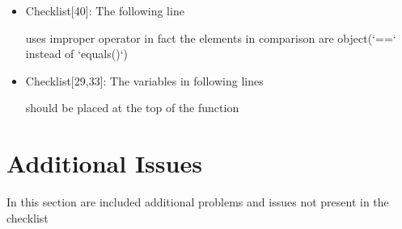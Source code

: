 \documentclass[11pt,titlepage]{article} %
\begin{document}
\begin{itemize}
\begin{itemize}
    \item Checklist[40]: The following line
      
      uses improper operator in fact the elements in comparison are object(`==` instead of `equals()`)
    \item Checklist[29,33]: The variables in following lines
      
      should be placed at the top of the function
    \end{itemize}
  \end{itemize}
\newpage
\section{Additional Issues}
  In this section are included additional problems and issues not present in the checklist
\end{document}
